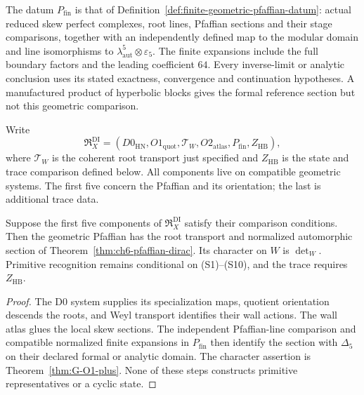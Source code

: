 \begin{definition}
\label{def:G-finite-pfaffian-section}
The datum \(P_{\mathrm{fin}}\) is that of
Definition~\ref{def:finite-geometric-pfaffian-datum}: actual reduced
skew perfect complexes, root lines, Pfaffian sections and their
stage comparisons, together with an independently defined map to
the modular domain and line isomorphisms to
\(\lambda_{\mathrm{aut}}^5\otimes\varepsilon_5\).
The finite expansions include the full boundary factors and the
leading coefficient \(64\). Every inverse-limit or analytic
conclusion uses its stated exactness, convergence and continuation
hypotheses. A manufactured product of hyperbolic blocks gives the
formal reference section but not this geometric comparison.
\end{definition}

\begin{definition}
\label{def:G-retained-obstruction-datum}
Write
\[
 \mathfrak R_X^{\mathrm{DI}}=
 (D0_{\mathrm{HN}},O1_{\mathrm{quot}},\mathcal T_W,
       O2_{\mathrm{atlas}},P_{\mathrm{fin}},Z_{\mathrm{HB}}),
\]
where \(\mathcal T_W\) is the coherent root transport just
specified and \(Z_{\mathrm{HB}}\) is the state and trace
comparison defined below. All components live on compatible
geometric systems. The first five concern the Pfaffian and its
orientation; the last is additional trace data.
\end{definition}

\begin{theorem}
\label{thm:G-four-obstruction-criterion}
Suppose the first five components of
\(\mathfrak R_X^{\mathrm{DI}}\) satisfy their comparison
conditions. Then the geometric Pfaffian has the root transport and
normalized automorphic section of
Theorem~\ref{thm:ch6-pfaffian-dirac}. Its character on \(W\)
is \(\det_W\). Primitive recognition remains conditional on
\textup{(S1)}--\textup{(S10)}, and the trace requires
\(Z_{\mathrm{HB}}\).
\end{theorem}
\begin{proof}
The D0 system supplies its specialization maps, quotient orientation
descends the roots, and Weyl transport identifies their wall actions.
The wall atlas glues the local skew sections. The independent
Pfaffian-line comparison and compatible normalized finite expansions
in \(P_{\mathrm{fin}}\) then identify the section with
\(\Delta_5\) on their declared formal or analytic domain.
The character assertion is Theorem~\ref{thm:G-O1-plus}.
None of these steps constructs primitive representatives or a
cyclic state.
\end{proof}

